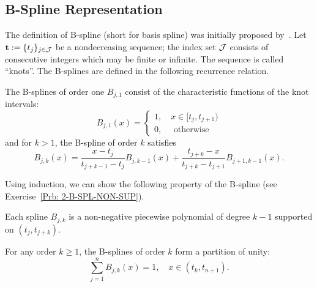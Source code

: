 \subsection{B-Spline Representation}
The definition of B-spline (short for basis spline) was initially proposed by~\cite{curry1947spline}. Let $\mathbf t:= \{t_j\}_{j\in \mathcal J}$ be a nondecreasing sequence; the index set $\mathcal J$ consists of consecutive integers which may be finite or infinite. The sequence is called ``knots''. The B-splines are defined in the following recurrence relation. 
\begin{definition}
The B-splines of order one $B_{j, 1}$ consist of the characteristic functions of the knot intervals:
\begin{equation*}
    B_{j, 1}(x) = \begin{cases}
        1,\quad x\in [t_j, t_{j+1})\\
        0,\quad \text{ otherwise }
    \end{cases}
\end{equation*}
and for $k > 1$, the B-spline of order $k$ satisfies
    $$B_{j,k}(x) = \frac{x - t_j}{t_{j+k-1} - t_j} B_{j, k-1}(x) + \frac{t_{j+k} - x}{t_{j+k} - t_{j+1}} B_{j+1, k-1}(x).$$
\end{definition}
Using induction, we can show the following property of the B-spline (see Exercise~\ref{Prb: 2-B-SPL-NON-SUP}).
\begin{lemma}[Property I]
\label{Lem: 2-B-SPL-NON-SUP}
    Each spline $B_{j,k}$ is a non-negative piecewise polynomial of degree $k-1$ supported on $(t_j, t_{j+k})$.
\end{lemma}
\begin{lemma}[Property II]
\label{Lem: 2-B-SPL-PAR-UNI}
   For any order $k\ge 1$, the B-splines of order $k$ form a partition of unity:
   $$\sum_{j = 1}^n B_{j, k}(x) = 1,\quad x\in (t_{k}, t_{n+1}).$$
\end{lemma}
